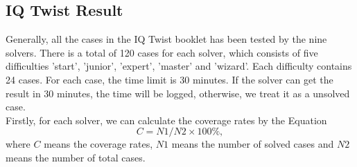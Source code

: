 \subsection{IQ Twist Result}
\label{sec:IQtwistresult}
Generally, all the cases in the IQ Twist booklet has been tested by the nine solvers. There is a total of 120 cases for each solver, which consists of five difficulties 'start', 'junior', 'expert', 'master' and 'wizard'. Each difficulty contains 24 cases. For each case, the time limit is 30 minutes. If the solver can get the result in 30 minutes, the time will be logged, otherwise, we treat it as a unsolved case.
\\Firstly, for each solver, we can calculate the coverage rates by the Equation
\begin{equation}
   C= N1/N2\times 100\% ,
\end{equation}
where $C$ means the coverage rates, $N1$ means the number of solved cases and $N2$ means the number of total cases.
